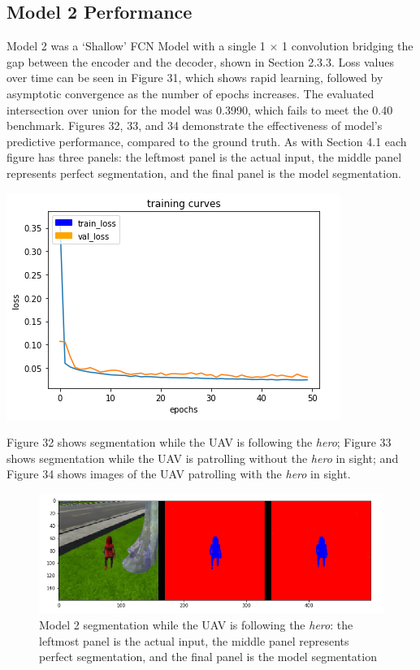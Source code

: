 \documentclass[a4paper]{article}
\begin{document}
\subsection{Model 2 Performance}
\begin{minipage}{0.45\textwidth}
Model 2 was a `Shallow' FCN Model with a single 1 $\times$ 1 convolution bridging the gap between the encoder and the decoder, shown in Section 2.3.3. Loss values over time can be seen in Figure 31, which shows rapid learning, followed by asymptotic convergence as the number of epochs increases. The evaluated intersection over union for the model was 0.3990, which fails to meet the 0.40 benchmark. Figures 32, 33, and 34 demonstrate the effectiveness of model's predictive performance, compared to the ground truth. As with Section 4.1 each figure has three panels: the leftmost panel is the actual input, the middle panel represents perfect segmentation, and the final panel is the model segmentation.
\end{minipage}
\hspace{1cm}
\begin{minipage}{0.45\textwidth}
\centering
\includegraphics[scale=0.5]{Model_2}
\end{minipage}

\vspace{0.5cm}

Figure 32 shows segmentation while the UAV is following the \textit{hero}; Figure 33 shows segmentation while the UAV is patrolling without the \textit{hero} in sight; and Figure 34 shows images of the UAV patrolling with the \textit{hero} in sight.
\begin{figure}[h]
\centering
\includegraphics[scale=0.4]{model_2_1}
\caption{Model 2 segmentation while the UAV is following the \textit{hero}: the leftmost panel is the actual input, the middle panel represents perfect segmentation, and the final panel is the model segmentation}
\end{figure}
\end{document}
